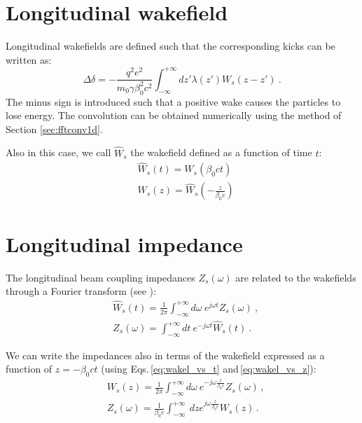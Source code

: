 \section{Longitudinal wakefield}

Longitudinal wakefields are defined such that the corresponding kicks can be written as:
\begin{equation}
    \Delta \delta = -\frac{q^2 e^2}{m_0 \gamma \beta_0^2 c^2} \int_{-\infty}^{+\infty} dz' \lambda(z') W_s(z-z') ~ .
\end{equation}
The minus sign is introduced such that a positive wake causes the particles to lose energy. The convolution can be obtained numerically using the method of Section \ref{sec:fftconv1d}.

Also in this case, we call $\widehat{W}_{s}$ the wakefield defined as a function of time $t$:
\begin{align}
    &\widehat{W}_{s}(t) = {W}_{s}\left(\beta_0 c t\right) \label{eq:wakel_vs_t}\\
    &W_s(z) = \widehat{W}_{s}\left(-\frac{z}{\beta_0 c}\right) \label{eq:wakel_vs_z}
\end{align}

\section{Longitudinal impedance}

The longitudinal beam coupling impedances $Z_{s}(\omega)$ are related to the wakefields through a Fourier transform (see \cite[Eq. 1.216]{Mounet:Thesis}):
\begin{align}
    &\widehat{W}_s(t) = \frac{1}{2\pi}\int_{-\infty}^{+\infty} d\omega \ e^{j\omega t} Z_{s}(\omega)~,\label{eq:wake_from_imp_long}\\
    &Z_s(\omega) = \int_{-\infty}^{+\infty} dt \ e^{-j\omega t} \widehat{W}_{s}(t)~.\label{eq:imp_from_wake_long}
\end{align}

We can write the impedances also in terms of the wakefield expressed as a function of $z= -\beta_0 c t$ (using Eqs.\,\ref{eq:wakel_vs_t} and\,\ref{eq:wakel_vs_z}):
\begin{align}
    &W_{s}(z) = \frac{1}{2\pi}\int_{-\infty}^{+\infty} d\omega \ e^{-j\omega \frac{z}{\beta_0 c}} Z_{s}(\omega)\, ,\\
    &Z_{s}(\omega) = \frac{1}{\beta_0 c} \int_{-\infty}^{+\infty} \ dz e^{j \omega \frac{z}{\beta_0 c}} W_{s}(z)\, .
\end{align}

